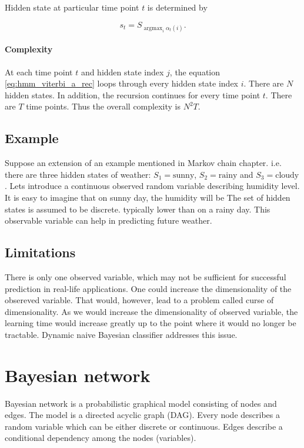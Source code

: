 \documentclass[thesis=B,english]{FITthesis}[2012/06/26]
\DeclareMathOperator*{\argmax}{argmax} %
\begin{document}
Hidden state at particular time point $t$ is determined by

\begin{equation}
s_t = S_{\argmax_i \alpha_{t}(i)}.
\end{equation}

\paragraph{Complexity}

At each time point $t$ and hidden state index $j$, the equation \ref{eq:hmm_viterbi_a_rec} loops through every hidden state index $i$. There are $N$ hidden states. In addition, the recursion continues for every time point $t$. There are $T$ time points. Thus the overall complexity is
$N^2 T$.

\subsection{Example}
Suppose an extension of an example mentioned in Markov chain chapter. i.e. there are three hidden states of weather: $S_1 = \text{sunny}$, $S_2 = \text{rainy}$ and $S_3 = \text{cloudy}$. Lets introduce a continuous observed random variable describing humidity level. It is easy to imagine that on sunny day, the humidity will be The set of hidden states is assumed to be discrete.
typically lower than on a rainy day. This observable variable can help in predicting future weather.

\subsection{Limitations}
There is only one observed variable, which may not be sufficient for successful prediction in real-life applications. One could increase the dimensionality of the obsereved variable. That would, however, lead to a problem called curse of dimensionality. As we would increase the dimensionality of observed variable, the learning time would increase greatly up to the point where it would no longer be tractable. Dynamic naive Bayesian classifier addresses this issue.

\section{Bayesian network}

Bayesian network is a probabilistic graphical model consisting of nodes and edges. The model is a directed acyclic graph (DAG). Every node describes a random variable which can be either discrete or continuous. Edges describe a conditional dependency among the nodes (variables).
\end{document}

